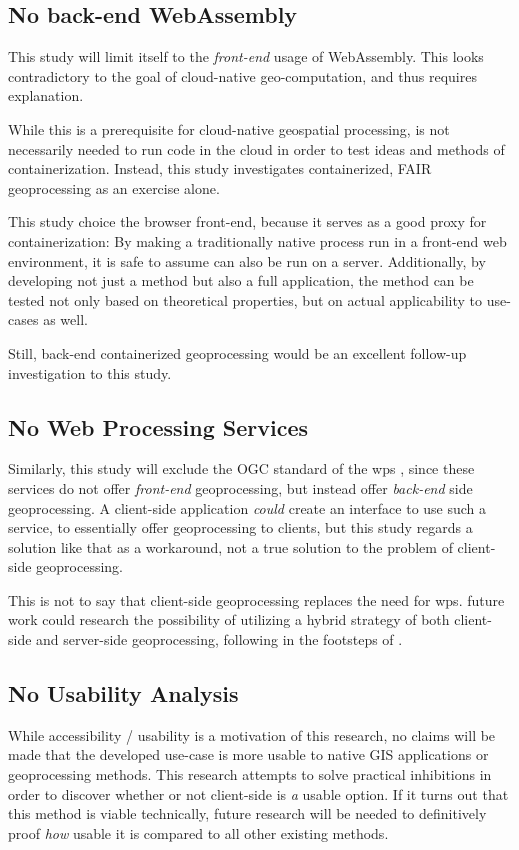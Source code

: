\subsection*{ No back-end WebAssembly } 
This study will limit itself to the \emph{front-end} usage of WebAssembly. This looks contradictory to the goal of cloud-native geo-computation, and thus requires explanation.

While this is a prerequisite for cloud-native geospatial processing, is not necessarily needed to run code in the cloud in order to test ideas and methods of containerization. 
Instead, this study investigates containerized, FAIR geoprocessing as an exercise alone.  


This study choice the browser front-end, because it serves as a good proxy for containerization:
By making a traditionally native process run in a front-end web environment, it is safe to assume can also be run on a server. 
Additionally, by developing not just a method but also a full application, the method can be tested not only based on theoretical properties, but on actual applicability to use-cases as well. 

Still, back-end containerized geoprocessing would be an excellent follow-up investigation to this study. 

\subsection*{ No Web Processing Services } 
Similarly, this study will exclude the OGC standard of the \ac{wps} \cite{ogc_web_2015}, since these services do not offer \emph{front-end} geoprocessing, but instead offer \emph{back-end} side geoprocessing. A client-side application \textit{could} create an interface to use such a service, to essentially offer geoprocessing to clients, but this study regards a solution like that as a workaround, not a true solution to the problem of client-side geoprocessing. 

This is not to say that client-side geoprocessing replaces the need for \ac{wps}. 
future work could research the possibility of utilizing a hybrid strategy of both client-side and server-side geoprocessing, following in the footsteps of \cite{panidi_hybrid_2015}. 

\subsection*{ No Usability Analysis } %
While accessibility / usability is a motivation of this research, no claims will be made that the developed use-case is more usable to native GIS applications or geoprocessing methods. This research attempts to solve practical inhibitions in order to discover whether or not client-side is \emph{a} usable option. If it turns out that this method is viable technically, future research will be needed to definitively proof \emph{how} usable it is compared to all other existing methods.  

